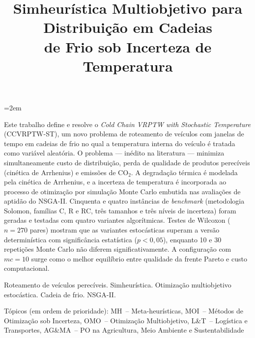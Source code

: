 \documentclass[a4paper,11pt]{article}
\begin{document}
\emergencystretch=2em

\title{Simheurística Multiobjetivo para Distribuição em Cadeias\\
       de Frio sob Incerteza de Temperatura}

\maketitle
\thispagestyle{fancy}

\vspace{8mm}
\begin{resumo}
Este trabalho define e resolve o \textit{Cold Chain VRPTW with Stochastic Temperature} (CCVRPTW-ST), um novo problema de roteamento de veículos com
janelas de tempo em cadeias de frio no qual a temperatura interna do veículo
é tratada como variável aleatória.
O problema --- inédito na literatura --- minimiza simultaneamente custo de distribuição, perda de qualidade
de produtos perecíveis (cinética de Arrhenius) e emissões de CO$_2$.
A degradação térmica é modelada pela cinética de Arrhenius, e a incerteza
de temperatura é incorporada ao processo de otimização por simulação
Monte Carlo embutida nas avaliações de aptidão do NSGA-II.
Cinquenta e quatro inst\^ancias de \textit{benchmark} (metodologia Solomon,
famílias C, R e RC, tr\^es tamanhos e tr\^es níveis de incerteza) foram
geradas e testadas com quatro variantes algorítmicas.
Testes de Wilcoxon ($n=270$ pares) mostram que as variantes estocásticas
superam a versão determinística com signific\^ancia estatística ($p<0{,}05$),
enquanto 10 e 30 repetições Monte Carlo não diferem significativamente.
A configuração com $mc=10$ surge como o melhor equilíbrio entre qualidade
da frente Pareto e custo computacional.
\end{resumo}

\bigskip
\begin{palchaves}
Roteamento de veículos perecíveis. Simheurística. Otimização multiobjetivo estocástica. Cadeia de frio. NSGA-II.

\bigskip
{\sloppy\noindent Tópicos (em ordem de prioridade): MH~-- Meta-heurísticas, MOI~-- Métodos de Otimização sob Incerteza, OMO~-- Otimização Multiobjetivo, L\&T~-- Logística e Transportes, AG\&MA~-- PO na Agricultura, Meio Ambiente e Sustentabilidade\par}
\end{palchaves}
\end{document}

